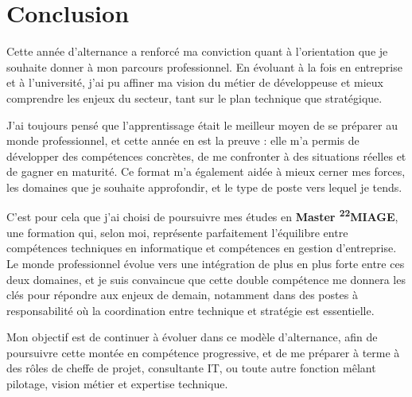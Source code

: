 \section{Conclusion}
\label{conclusion}

Cette année d’alternance a renforcé ma conviction quant à l’orientation que je souhaite donner à mon parcours professionnel. En évoluant à la fois en entreprise et à l’université, j’ai pu affiner ma vision du métier de développeuse et mieux comprendre les enjeux du secteur, tant sur le plan technique que stratégique.

J’ai toujours pensé que l’apprentissage était le meilleur moyen de se préparer au monde professionnel, et cette année en est la preuve : elle m’a permis de développer des compétences concrètes, de me confronter à des situations réelles et de gagner en maturité. Ce format m’a également aidée à mieux cerner mes forces, les domaines que je souhaite approfondir, et le type de poste vers lequel je tends.

C’est pour cela que j’ai choisi de poursuivre mes études en \textbf{Master \textsuperscript{22}MIAGE}, une formation qui, selon moi, représente parfaitement l’équilibre entre compétences techniques en informatique et compétences en gestion d’entreprise. Le monde professionnel évolue vers une intégration de plus en plus forte entre ces deux domaines, et je suis convaincue que cette double compétence me donnera les clés pour répondre aux enjeux de demain, notamment dans des postes à responsabilité où la coordination entre technique et stratégie est essentielle.

Mon objectif est de continuer à évoluer dans ce modèle d’alternance, afin de poursuivre cette montée en compétence progressive, et de me préparer à terme à des rôles de cheffe de projet, consultante IT, ou toute autre fonction mêlant pilotage, vision métier et expertise technique.
